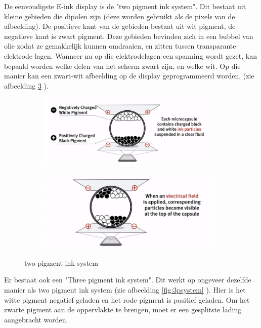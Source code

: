\documentclass[a4paper,kul]{kulakarticle} %
\begin{document}
De eenvoudigste E-ink display is de "two pigment ink system". Dit bestaat uit kleine gebieden die dipolen zijn (deze worden gebruikt als de pixels van de afbeelding). De positieve kant van de gebieden bestaat uit wit pigment, de negatieve kant is zwart pigment. Deze gebieden bevinden zich in een bubbel van olie zodat ze gemakkelijk kunnen omdraaien, en zitten tussen transparante elektrode lagen. Wanneer nu op die elektrodelagen een spanning wordt gezet, kan bepaald worden welke delen van het scherm zwart zijn, en welke wit. Op die manier kan een zwart-wit afbeelding op de display geprogrammeerd worden. (zie afbeelding \ref{fig:2psystem} ).

\begin{figure}[h]
	\centering
	\begin{subfigure}{.5\textwidth}
		\centering
		\includegraphics[width=0.95\textwidth]{Two_pigment_ink_system1}
		\label{fig:sub2psystem}
	\end{subfigure}%
	\begin{subfigure}{.5\textwidth}
		\centering
		\includegraphics[width=0.95\textwidth]{Two_pigment_ink_system2}
		\label{fig:sub2psystem2}
	\end{subfigure}
	\caption{two pigment ink system}
	\label{fig:2psystem}
\end{figure}

Er bestaat ook een "Three pigment ink system". Dit werkt op ongeveer dezelfde manier als two pigment ink system (zie afbeelding \ref{fig:3psystem} ). Hier is het witte pigment negatief geladen en het rode pigment is positief geladen. Om het zwarte pigment aan de oppervlakte te brengen, moet er een gesplitste lading aangebracht worden.
\end{document}
